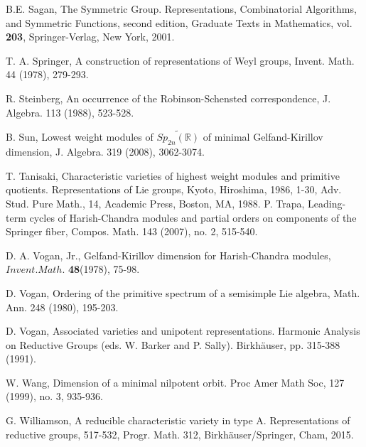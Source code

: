 \documentclass{amsart}[12pt]
\numberwithin{equation}{section}
\begin{document}
\begin{thebibliography}{99}
 B.E. Sagan, The Symmetric Group. Representations, Combinatorial Algorithms, and Symmetric Functions, second edition, Graduate Texts in Mathematics, vol. {\bf 203}, Springer-Verlag, New York, 2001.





T. A. Springer, A construction of representations of Weyl groups, Invent. Math. 44 (1978), 279-293.

R. Steinberg, An occurrence of the Robinson-Schensted correspondence, J. Algebra. 113 (1988), 523-528.

B. Sun,  Lowest weight modules of $\widetilde{Sp_{2n}(\mathbb{R})}$ of minimal Gelfand-Kirillov dimension,   J. Algebra.  319 (2008), 3062-3074.





T. Tanisaki, Characteristic varieties of highest weight modules and primitive quotients. Representations of Lie groups, Kyoto, Hiroshima, 1986, 1-30, Adv. Stud. Pure Math., 14, Academic Press, Boston, MA, 1988.
P. Trapa, Leading-term cycles of Harish-Chandra modules and partial orders on components of the Springer fiber, Compos. Math. 143 (2007), no. 2, 515-540.

D. A. Vogan, Jr., Gelfand-Kirillov dimension for Harish-Chandra modules, $ Invent.Math.$ {\bf 48}(1978), 75-98.

D. Vogan, Ordering of the primitive spectrum of a semisimple Lie  algebra, Math. Ann. 248 (1980), 195-203.
%
%
%





%
%
%
D. Vogan, Associated varieties and unipotent representations. Harmonic Analysis on
Reductive Groups (eds. W. Barker and P. Sally). Birkh\"{a}user, pp. 315-388
(1991).


W. Wang, Dimension of a minimal nilpotent orbit. Proc Amer Math Soc, 127 (1999), no. 3, 935-936.


G. Williamson, A reducible characteristic variety in type A. Representations of reductive groups, 517-532, Progr. Math. 312,  Birkh\"{a}user/Springer, Cham, 2015.


\end{thebibliography}
\end{document}
